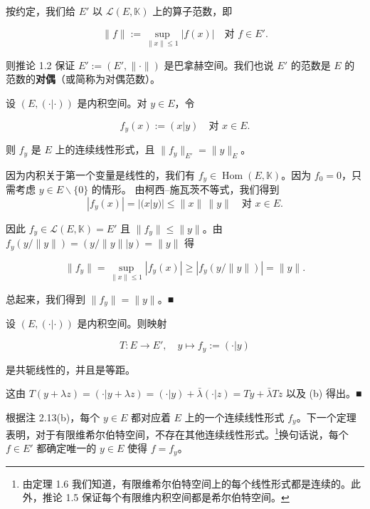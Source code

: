 \begin{remark}

\begin{items}
\item

按约定，我们给 $ E' $ 以 $ \mathcal{L}(E, \mathbb{K}) $ 上的算子范数，即

\[
\|f\| := \sup_{\|x\| \le 1} |f(x)| \quad \text{对 } f \in E' .
\]

则推论 1.2 保证 $ E' := (E', \|\cdot\|) $ 是巴拿赫空间。我们也说 $ E' $ 的范数是 $ E $ 的范数的\textbf{对偶}（或简称为对偶范数）。

\item

设 $ (E, (\cdot|\cdot)) $ 是内积空间。对 $ y \in E $，令

\[
f_y(x) := (x|y) \quad \text{对 } x \in E .
\]

则 $ f_y $ 是 $ E $ 上的连续线性形式，且 $ \|f_y\|_{E'} = \|y\|_E $。

\proofhead
因为内积关于第一个变量是线性的，我们有 $ f_y \in \operatorname{Hom}(E, \mathbb{K}) $。因为 $ f_0 = 0 $，只需考虑 $ y \in E \backslash \{0\} $ 的情形。
由柯西–施瓦茨不等式，我们得到
\[
|f_y(x)| = |(x|y)| \le \|x\| \, \|y\| \quad \text{对 } x \in E .
\]

因此 $ f_y \in \mathcal{L}(E, \mathbb{K}) = E' $ 且 $ \|f_y\| \le \|y\| $。由 $ f_y(y/\|y\|) = (y/\|y\| | y) = \|y\| $ 得

\[
\|f_y\| = \sup_{\|x\| \le 1} |f_y(x)| \ge |f_y(y/\|y\|)| = \|y\| .
\]

总起来，我们得到 $ \|f_y\| = \|y\| $。\nobreak\hspace{0.35em}■

\item

设 $ (E, (\cdot|\cdot)) $ 是内积空间。则映射

\[
T : E \to E' , \quad y \mapsto f_y := (\cdot|y)
\]

是共轭线性的，并且是等距。

\proofhead
这由 $ T(y + \lambda z) = (\cdot | y + \lambda z) = (\cdot | y) + \bar{\lambda}(\cdot | z) = Ty + \bar{\lambda}Tz $ 以及 (b) 得出。\nobreak\hspace{0.35em}■
\end{items}

根据注 2.13(b)，每个 $ y \in E $ 都对应着 $ E $ 上的一个连续线性形式 $ f_y $。下一个定理表明，对于有限维希尔伯特空间，不存在其他连续线性形式。\footnote{由定理 1.6 我们知道，有限维希尔伯特空间上的每个线性形式都是连续的。此外，推论 1.5 保证每个有限维内积空间都是希尔伯特空间。}换句话说，每个 $ f \in E' $ 都确定唯一的 $ y \in E $ 使得 $ f = f_y $。

\end{remark}

